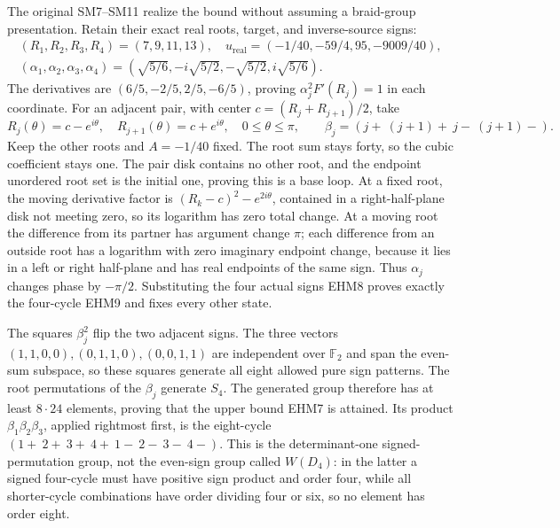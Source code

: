 \documentclass[
  10pt,
  a4paper,
]{article}
\begin{document}
The original SM7--SM11 realize the bound without assuming a braid-group
presentation. Retain their exact real roots, target, and inverse-source
signs: \[
\begin{gathered}
(R_1,R_2,R_3,R_4)=(7,9,11,13),\quad
u_{\mathrm{real}}=(-1/40,-59/4,95,-9009/40),\\
(\alpha_1,\alpha_2,\alpha_3,\alpha_4)
=(\sqrt{5/6},-i\sqrt{5/2},-\sqrt{5/2},i\sqrt{5/6}).
\end{gathered}
\tag{EHM8}
\] The derivatives are \((6/5,-2/5,2/5,-6/5)\), proving
\(\alpha_j^2F'(R_j)=1\) in each coordinate. For an adjacent pair, with
center \(c=(R_j+R_{j+1})/2\), take \[
R_j(\theta)=c-e^{i\theta},\quad
R_{j+1}(\theta)=c+e^{i\theta},\quad0\le\theta\le\pi,
\qquad \beta_j=(j+\ (j+1)+\ j-\ (j+1)-).
\tag{EHM9}
\] Keep the other roots and \(A=-1/40\) fixed. The root sum stays forty,
so the cubic coefficient stays one. The pair disk contains no other
root, and the endpoint unordered root set is the initial one, proving
this is a base loop. At a fixed root, the moving derivative factor is
\((R_k-c)^2-e^{2i\theta}\), contained in a right-half-plane disk not
meeting zero, so its logarithm has zero total change. At a moving root
the difference from its partner has argument change \(\pi\); each
difference from an outside root has a logarithm with zero imaginary
endpoint change, because it lies in a left or right half-plane and has
real endpoints of the same sign. Thus \(\alpha_j\) changes phase by
\(-\pi/2\). Substituting the four actual signs EHM8 proves exactly the
four-cycle EHM9 and fixes every other state.

The squares \(\beta_j^2\) flip the two adjacent signs. The three vectors
\((1,1,0,0),(0,1,1,0),(0,0,1,1)\) are independent over \(\mathbb F_2\)
and span the even-sum subspace, so these squares generate all eight
allowed pure sign patterns. The root permutations of the \(\beta_j\)
generate \(S_4\). The generated group therefore has at least
\(8\cdot24\) elements, proving that the upper bound EHM7 is attained.
Its product \(\beta_1\beta_2\beta_3\), applied rightmost first, is the
eight-cycle \((1+\ 2+\ 3+\ 4+\ 1-\ 2-\ 3-\ 4-)\). This is the
determinant-one signed-permutation group, not the even-sign group called
\(W(D_4)\): in the latter a signed four-cycle must have positive sign
product and order four, while all shorter-cycle combinations have order
dividing four or six, so no element has order eight.
\end{document}
